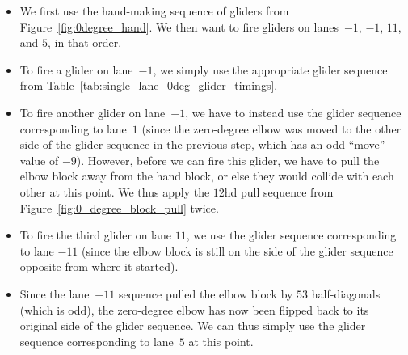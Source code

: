 \begin{itemize}
	\item We first use the hand-making sequence of gliders from Figure~\ref{fig:0degree_hand}. We then want to fire gliders on lanes~$-1$, $-1$, $11$, and $5$, in that order.\smallskip
	
	\item To fire a glider on lane~$-1$, we simply use the appropriate glider sequence from Table~\ref{tab:single_lane_0deg_glider_timings}.\smallskip
	
	\item To fire another glider on lane~$-1$, we have to instead use the glider sequence corresponding to lane~$1$ (since the zero-degree elbow was moved to the other side of the glider sequence in the previous step, which has an odd ``move'' value of $-9$). However, before we can fire this glider, we have to pull the elbow block away from the hand block, or else they would collide with each other at this point. We thus apply the $12$hd pull sequence from Figure~\ref{fig:0_degree_block_pull} twice.\smallskip
	
	\item To fire the third glider on lane $11$, we use the glider sequence corresponding to lane $-11$ (since the elbow block is still on the side of the glider sequence opposite from where it started).\smallskip
	
	\item Since the lane~$-11$ sequence pulled the elbow block by $53$ half-diagonals (which is odd), the zero-degree elbow has now been flipped back to its original side of the glider sequence. We can thus simply use the glider sequence corresponding to lane~$5$ at this point.\smallskip
\end{itemize}

